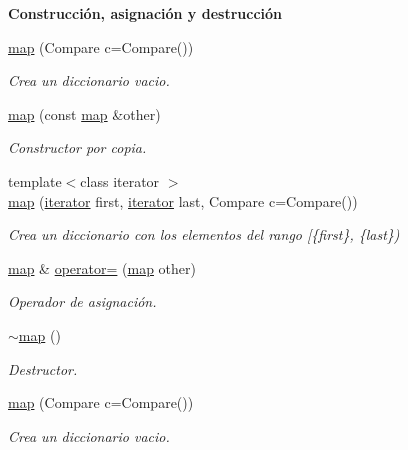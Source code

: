 \begin{Indent}\textbf{ Construcción, asignación y destrucción}\par
\begin{DoxyCompactItemize}
\item 
\hyperlink{classaed2_1_1map_a64da1d965b13eb28cdb3837bc17a18cf}{map} (Compare c=Compare())
\begin{DoxyCompactList}\small\item\em Crea un diccionario vacio. \end{DoxyCompactList}\item 
\hyperlink{classaed2_1_1map_a7a77950a3d8e637bfa7cf5dcd904f257}{map} (const \hyperlink{classaed2_1_1map}{map} \&other)
\begin{DoxyCompactList}\small\item\em Constructor por copia. \end{DoxyCompactList}\item 
{\footnotesize template$<$class iterator $>$ }\\\hyperlink{classaed2_1_1map_a5d336f3248572beb56be383dcc95cfeb}{map} (\hyperlink{classaed2_1_1map_1_1iterator}{iterator} first, \hyperlink{classaed2_1_1map_1_1iterator}{iterator} last, Compare c=Compare())
\begin{DoxyCompactList}\small\item\em Crea un diccionario con los elementos del rango \mbox{[}\{first\}, \{last\}) \end{DoxyCompactList}\item 
\hyperlink{classaed2_1_1map}{map} \& \hyperlink{classaed2_1_1map_ac606d334809066929522964d45e76317}{operator=} (\hyperlink{classaed2_1_1map}{map} other)
\begin{DoxyCompactList}\small\item\em Operador de asignación. \end{DoxyCompactList}\item 
\hyperlink{classaed2_1_1map_ab22c9a85c2dadbc286cd30e97069a8e6}{$\sim$map} ()
\begin{DoxyCompactList}\small\item\em Destructor. \end{DoxyCompactList}\item 
\hyperlink{classaed2_1_1map_a64da1d965b13eb28cdb3837bc17a18cf}{map} (Compare c=Compare())
\begin{DoxyCompactList}\small\item\em Crea un diccionario vacio. \end{DoxyCompactList}\item 

\end{DoxyCompactItemize}
\end{Indent}
